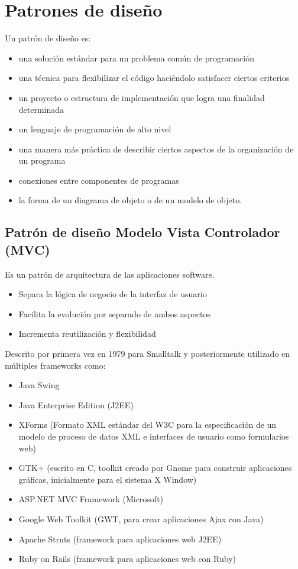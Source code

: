
\section{Patrones de diseño}
Un patrón de diseño es: \cite{patrondiseno}\\
\begin{itemize}
    \item una solución estándar para un problema común de programación
    \item una técnica para flexibilizar el código haciéndolo satisfacer ciertos criterios
    \item un proyecto o estructura de implementación que logra una finalidad determinada
    \item un lenguaje de programación de alto nivel
    \item una manera más práctica de describir ciertos aspectos de la organización de un programa
    \item conexiones entre componentes de programas
    \item la forma de un diagrama de objeto o de un modelo de objeto.
\end{itemize}
 

\subsection{Patrón de diseño Modelo Vista Controlador (MVC)}
Es un patrón de arquitectura de las aplicaciones software.\\ 
\begin{itemize}
    \item Separa la lógica de negocio de la interfaz de usuario
    \item Facilita la evolución por separado de ambos aspectos
    \item Incrementa reutilización y flexibilidad
\end{itemize}

Descrito por primera vez en 1979 para Smalltalk y posteriormente utilizado en múltiples frameworks como: 
\begin{itemize}
    \item Java Swing
    \item Java Enterprise Edition (J2EE)
    \item XForms (Formato XML estándar del W3C para la especificación de un modelo de proceso de datos XML e interfaces de usuario como formularios web)
    \item GTK+ (escrito en C, toolkit creado por Gnome para construir aplicaciones gráficas, inicialmente para el sistema X Window)
    \item ASP.NET MVC Framework (Microsoft)
    \item Google Web Toolkit (GWT, para crear aplicaciones Ajax con Java)
    \item Apache Struts (framework para aplicaciones web J2EE)
    \item Ruby on Rails (framework para aplicaciones web con Ruby)
\end{itemize}


